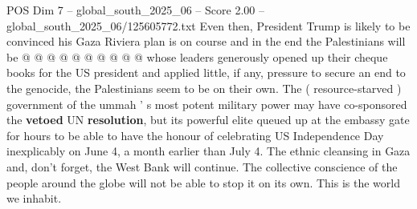 \begin{textsample}{POS Dim 7 – global\_south\_2025\_06 – Score 2.00 – global\_south\_2025\_06/125605772.txt}
Even then, President Trump is likely to be convinced his Gaza Riviera plan is on course and in the end the Palestinians will be @ @ @ @ @ @ @ @ @ @ whose leaders generously opened up their cheque books for the US president and applied little, if any, pressure to secure an end to the genocide, the Palestinians seem to be on their own.
The ( resource-starved ) government of the ummah ' s most potent military power may have co-sponsored the \textbf{vetoed} UN \textbf{resolution}, but its powerful elite queued up at the embassy gate for hours to be able to have the honour of celebrating US Independence Day inexplicably on June 4, a month earlier than July 4.
The ethnic cleansing in Gaza and, don't forget, the West Bank will continue.
The collective conscience of the people around the globe will not be able to stop it on its own.
This is the world we inhabit.

\end{textsample}
